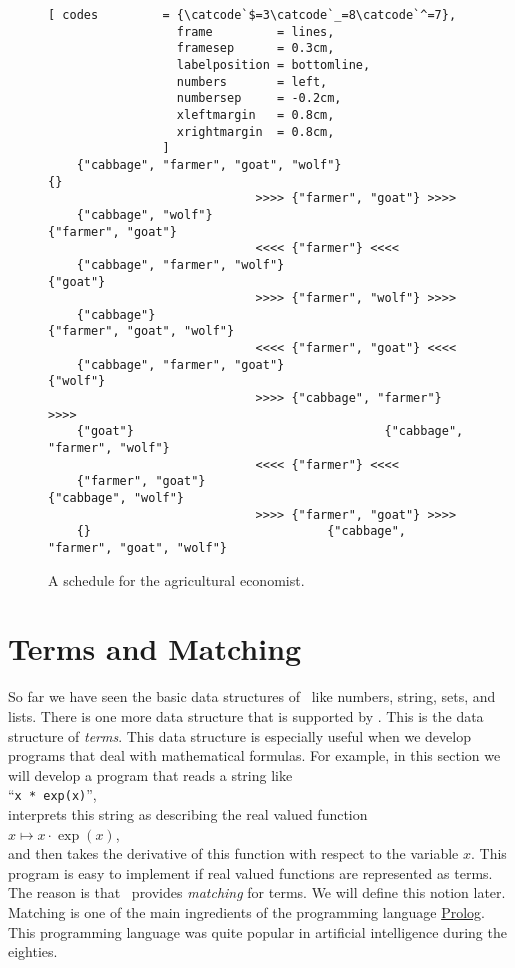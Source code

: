 \begin{figure}[!ht]
  \centering
\begin{Verbatim}[ codes         = {\catcode`$=3\catcode`_=8\catcode`^=7},
                  frame         = lines, 
                  framesep      = 0.3cm, 
                  labelposition = bottomline,
                  numbers       = left,
                  numbersep     = -0.2cm,
                  xleftmargin   = 0.8cm,
                  xrightmargin  = 0.8cm,
                ]
    {"cabbage", "farmer", "goat", "wolf"}                                 {}
                             >>>> {"farmer", "goat"} >>>> 
    {"cabbage", "wolf"}                                   {"farmer", "goat"}
                             <<<< {"farmer"} <<<< 
    {"cabbage", "farmer", "wolf"}                                   {"goat"}
                             >>>> {"farmer", "wolf"} >>>> 
    {"cabbage"}                                   {"farmer", "goat", "wolf"}
                             <<<< {"farmer", "goat"} <<<< 
    {"cabbage", "farmer", "goat"}                                   {"wolf"}
                             >>>> {"cabbage", "farmer"} >>>> 
    {"goat"}                                   {"cabbage", "farmer", "wolf"}
                             <<<< {"farmer"} <<<< 
    {"farmer", "goat"}                                   {"cabbage", "wolf"}
                             >>>> {"farmer", "goat"} >>>> 
    {}                                 {"cabbage", "farmer", "goat", "wolf"}
\end{Verbatim} 
\vspace*{-0.3cm}
\caption{A schedule for the agricultural economist.}  
\label{fig:wolf-ziege-solution}
\end{figure}


\section{Terms and Matching}
So far we have seen the basic data structures of \setlx\ like numbers, string, sets, and lists.
There is one more data structure that is supported by \setlx.  This is the data structure of
\colorbox{amethyst}{\emph{terms}}.  
This data structure is especially useful when we develop programs that deal with mathematical formulas.
For example, in this section we will develop a program that reads a string like 
\\[0.2cm]
\hspace*{1.3cm}
``\texttt{x * exp(x)}'',
\\[0.2cm]
interprets this string as describing the real valued function 
\\[0.2cm]
\hspace*{1.3cm}
$x \mapsto x \cdot \exp(x)$, 
\\[0.2cm]
and then takes the derivative of this function with respect to the variable $x$.  This program is
easy to implement if real valued functions are represented as terms.  The reason is that \setlx\ provides 
\colorbox{amethyst}{\emph{matching}} for terms.  We will define this notion later.  Matching
is one of the main ingredients of the programming language \href{https://en.wikipedia.org/wiki/Prolog}{Prolog}.
This programming language was quite popular in artificial intelligence during the eighties.


